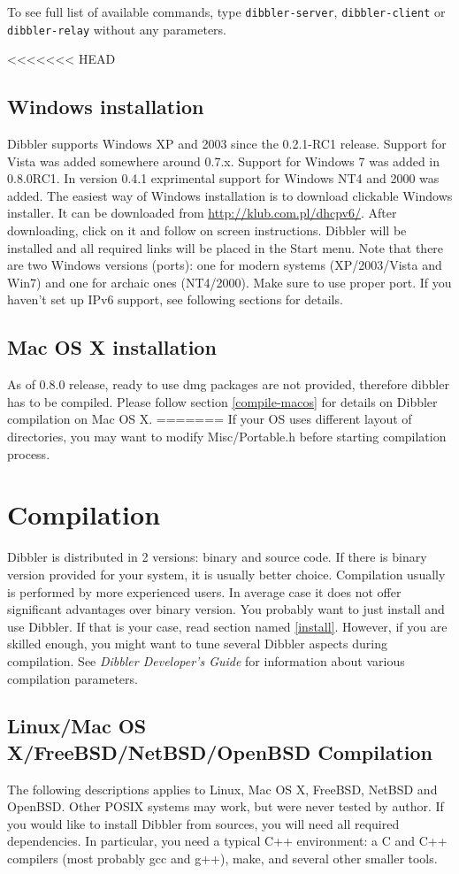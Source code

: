 To see full list of available commands, type \verb+dibbler-server+,
\verb+dibbler-client+ or \verb+dibbler-relay+ without any parameters.

<<<<<<< HEAD
\subsection{Windows installation}
Dibbler supports Windows XP and 2003 since the 0.2.1-RC1 release.
Support for Vista was added somewhere around 0.7.x. Support for
Windows 7 was added in 0.8.0RC1. In version 0.4.1 exprimental support
for Windows NT4 and 2000 was added. The easiest way of Windows
installation is to download clickable Windows installer. It can be
downloaded from \url{http://klub.com.pl/dhcpv6/}. After downloading,
click on it and follow on screen instructions. Dibbler will be
installed and all required links will be placed in the Start
menu. Note that there are two Windows versions (ports): one for modern
systems (XP/2003/Vista and Win7) and one for archaic ones
(NT4/2000). Make sure to use proper port. If you haven't set up IPv6
support, see following sections for details.

\subsection{Mac OS X installation}
As of 0.8.0 release, ready to use dmg packages are not provided,
therefore dibbler has to be compiled. Please follow section
\ref{compile-macos} for details on Dibbler compilation on Mac OS X.
=======
If your OS uses different layout of directories, you may want to
modify Misc/Portable.h before starting compilation process.

\newpage
\section{Compilation}
\label{compile}
Dibbler is distributed in 2 versions: binary and source code. If there
is binary version provided for your system,  it is usually better
choice.  Compilation usually is performed by more experienced users.
In average case it does not offer significant advantages over binary version.
You probably want to just install and use Dibbler. If that is your case, read section
named \ref{install}. However, if you are skilled enough, you might
want to tune several Dibbler aspects during compilation. See \emph{
Dibbler Developer's Guide} for information about various compilation
parameters.

\subsection{Linux/Mac OS X/FreeBSD/NetBSD/OpenBSD Compilation}
The following descriptions applies to Linux, Mac OS X, FreeBSD, NetBSD
and OpenBSD. Other POSIX systems may work, but were never tested by
author. If you would like to install Dibbler from sources, you will need all
required dependencies. In particular, you need a typical C++
environment: a C and C++ compilers (most probably gcc and g++), make,
and several other smaller tools.

